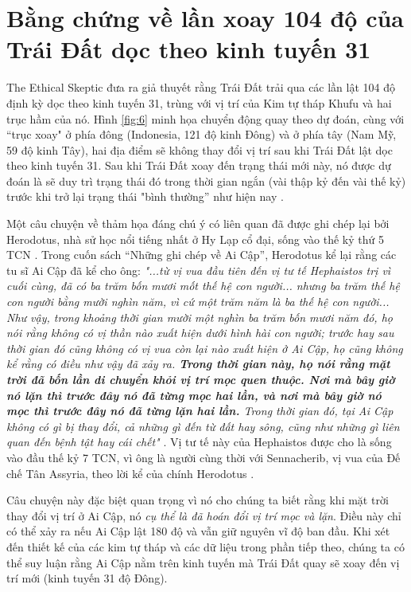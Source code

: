 \documentclass[10pt,twocolumn,letterpaper]{article}
\begin{document}
\section{Bằng chứng về lần xoay 104 độ của Trái Đất dọc theo kinh tuyến 31}

The Ethical Skeptic đưa ra giả thuyết rằng Trái Đất trải qua các lần lật 104 độ định kỳ dọc theo kinh tuyến 31, trùng với vị trí của Kim tự tháp Khufu và hai trục hầm của nó. Hình \ref{fig:6} minh họa chuyển động quay theo dự đoán, cùng với “trục xoay" ở phía đông (Indonesia, 121 độ kinh Đông) và ở phía tây (Nam Mỹ, 59 độ kinh Tây), hai địa điểm sẽ không thay đổi vị trí sau khi Trái Đất lật dọc theo kinh tuyến 31. Sau khi Trái Đất xoay đến trạng thái mới này, nó được dự đoán là sẽ duy trì trạng thái đó trong thời gian ngắn (vài thập kỷ đến vài thế kỷ) trước khi trở lại trạng thái "bình thường” như hiện nay \cite{150}.

Một câu chuyện về thảm họa đáng chú ý có liên quan đã được ghi chép lại bởi Herodotus, nhà sử học nổi tiếng nhất ở Hy Lạp cổ đại, sống vào thế kỷ thứ 5 TCN \cite{31}. Trong cuốn sách “Những ghi chép về Ai Cập”, Herodotus kể lại rằng các tu sĩ Ai Cập đã kể cho ông: \textit{"...từ vị vua đầu tiên đến vị tư tế Hephaistos trị vì cuối cùng, đã có ba trăm bốn mươi mốt thế hệ con người... nhưng ba trăm thế hệ con người bằng mười nghìn năm, vì cứ một trăm năm là ba thế hệ con người... Như vậy, trong khoảng thời gian mười một nghìn ba trăm bốn mươi năm đó, họ nói rằng không có vị thần nào xuất hiện dưới hình hài con người; trước hay sau thời gian đó cũng không có vị vua còn lại nào xuất hiện ở Ai Cập, họ cũng không kể rằng có điều như vậy đã xảy ra. \textbf{Trong thời gian này, họ nói rằng mặt trời đã bốn lần di chuyển khỏi vị trí mọc quen thuộc. Nơi mà bây giờ nó lặn thì trước đây nó đã từng mọc hai lần, và nơi mà bây giờ nó mọc thì trước đây nó đã từng lặn hai lần.} Trong thời gian đó, tại Ai Cập không có gì bị thay đổi, cả những gì đến từ đất hay sông, cũng như những gì liên quan đến bệnh tật hay cái chết"} \cite{32}. Vị tư tế này của Hephaistos được cho là sống vào đầu thế kỷ 7 TCN, vì ông là người cùng thời với Sennacherib, vị vua của Đế chế Tân Assyria, theo lời kể của chính Herodotus \cite{32,33,34}.

Câu chuyện này đặc biệt quan trọng vì nó cho chúng ta biết rằng khi mặt trời thay đổi vị trí ở Ai Cập, nó \textit{cụ thể là đã hoán đổi vị trí mọc và lặn}. Điều này chỉ có thể xảy ra nếu Ai Cập lật 180 độ và vẫn giữ nguyên vĩ độ ban đầu. Khi xét đến thiết kế của các kim tự tháp và các dữ liệu trong phần tiếp theo, chúng ta có thể suy luận rằng Ai Cập nằm trên kinh tuyến mà Trái Đất quay sẽ xoay đến vị trí mới (kinh tuyến 31 độ Đông).
\end{document}
